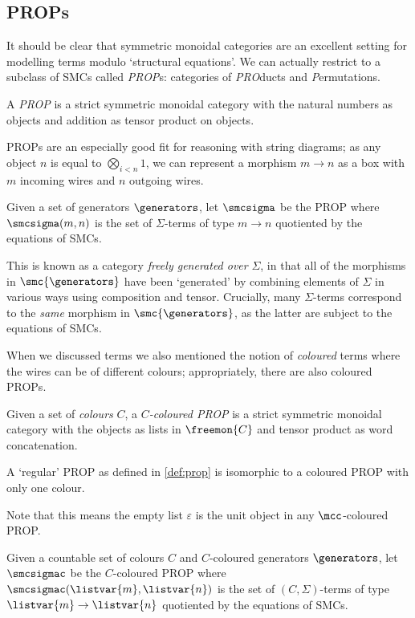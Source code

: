 \subsection{PROPs}

It should be clear that symmetric monoidal categories are an excellent setting
for modelling terms modulo `structural equations'.
We can actually restrict to a subclass of SMCs called \emph{PROP}s: categories
of \emph{PRO}ducts and \emph{P}ermutations.

\begin{definition}\label{def:prop}
    A \emph{PROP} is a strict symmetric monoidal category with the
    natural numbers as objects and addition as tensor product on objects.
\end{definition}

PROPs are an especially good fit for reasoning with string diagrams; as any
object \(n\) is equal to \(\bigotimes_{i < n} 1\), we can represent a morphism
\(m \to n\) as a box with \(m\) incoming wires and \(n\) outgoing wires.

\begin{definition}\label{def:freely-generated-prop}
    Given a set of generators \(\generators\), let \(\smcsigma\) be the
    PROP where \(\smcsigma(m, n)\) is the set of \(\Sigma\)-terms of type
    \(m \to n\) quotiented by the equations of SMCs.
\end{definition}

This is known as a category \emph{freely generated over} \(\Sigma\), in that all
of the morphisms in \(\smc{\generators}\) have been `generated' by combining
elements of \(\Sigma\) in various ways using composition and tensor.
Crucially, many \(\Sigma\)-terms correspond to the \emph{same} morphism in
\(\smc{\generators}\), as the latter are subject to the equations of SMCs.

When we discussed terms we also mentioned the notion of \emph{coloured} terms
where the wires can be of different colours; appropriately, there are also
coloured PROPs.

\begin{definition}
    Given a set of \emph{colours} \(C\), a \emph{\(C\)-coloured PROP} is a strict
    symmetric monoidal category with the objects as lists in \(\freemon{C}\) and
    tensor product as word concatenation.
\end{definition}

\begin{remark}
    A `regular' PROP as defined in \cref{def:prop} is isomorphic to a
    coloured PROP with only one colour.
\end{remark}

Note that this means the empty list \(\varepsilon\) is the unit
object in any \(\mcc\)-coloured PROP.

\begin{definition}\label{def:freely-generated-coloured-prop}
    Given a countable set of colours \(C\) and \(C\)-coloured generators
    \(\generators\), let \(\smcsigmac\) be the \(C\)-coloured PROP where
    \(\smcsigmac(\listvar{m}, \listvar{n})\) is the set of
    \((C,\Sigma)\)-terms of type \(\listvar{m} \to \listvar{n}\) quotiented by
    the equations of SMCs.
\end{definition}
